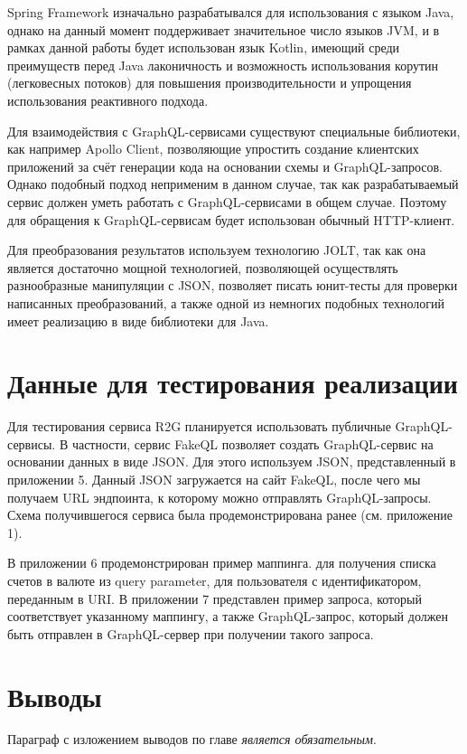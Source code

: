 Spring Framework изначально разрабатывался для использования с языком Java, однако на данный момент поддерживает значительное число языков JVM, и в рамках данной работы будет использован язык Kotlin, имеющий среди преимуществ перед Java лаконичность и возможность использования корутин (легковесных потоков) для повышения производительности и упрощения использования реактивного подхода.

Для взаимодействия с GraphQL-сервисами существуют специальные библиотеки, как например Apollo Client, позволяющие упростить создание клиентских приложений за счёт генерации кода на основании схемы и GraphQL-запросов.
Однако подобный подход неприменим в данном случае, так как разрабатываемый сервис должен уметь работать с GraphQL-сервисами в общем случае.
Поэтому для обращения к GraphQL-сервисам будет использован обычный HTTP-клиент.

Для преобразования результатов используем технологию JOLT, так как она является достаточно мощной технологией, позволяющей осуществлять разнообразные манипуляции с JSON, позволяет писать юнит-тесты для проверки написанных преобразований, а также одной из немногих подобных технологий имеет реализацию в виде библиотеки для Java.


\section{Данные для тестирования реализации}\label{sec:testing-data}

Для тестирования сервиса R2G планируется использовать публичные GraphQL-сервисы.
В частности, сервис FakeQL позволяет создать GraphQL-сервис на основании данных в виде JSON. Для этого используем JSON, представленный в приложении 5.
Данный JSON загружается на сайт FakeQL, после чего мы получаем URL эндпоинта, к которому можно отправлять GraphQL-запросы.
Схема получившегося сервиса была продемонстрирована ранее (см.
приложение 1).

В приложении 6 продемонстрирован пример маппинга.
для получения списка счетов в валюте из query parameter, для пользователя с идентификатором, переданным в URI. В приложении 7 представлен пример запроса, который соответствует указанному маппингу, а также GraphQL-запрос, который должен быть отправлен в GraphQL-сервер при получении такого запроса.


\section{Выводы} \label{sec:ch2-conclusion}

Параграф с изложением выводов по главе \textit{является обязательным}.